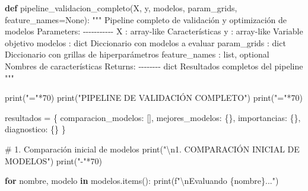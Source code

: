 \documentclass[
  doc,
  floatsintext,
  longtable,
  a4paper,
  nolmodern,
  notxfonts,
  notimes,
  12pt,
  colorlinks=true,linkcolor=blue,citecolor=blue,urlcolor=blue]{apa7}
\newenvironment{Shaded}{\begin{snugshade}}{\end{snugshade}}
\newcommand{\BuiltInTok}[1]{\textcolor[rgb]{0.00,0.23,0.31}{#1}}
\newcommand{\CharTok}[1]{\textcolor[rgb]{0.13,0.47,0.30}{#1}}
\newcommand{\CommentTok}[1]{\textcolor[rgb]{0.37,0.37,0.37}{#1}}
\newcommand{\ControlFlowTok}[1]{\textcolor[rgb]{0.00,0.23,0.31}{\textbf{#1}}}
\newcommand{\DecValTok}[1]{\textcolor[rgb]{0.68,0.00,0.00}{#1}}
\newcommand{\KeywordTok}[1]{\textcolor[rgb]{0.00,0.23,0.31}{\textbf{#1}}}
\newcommand{\NormalTok}[1]{\textcolor[rgb]{0.00,0.23,0.31}{#1}}
\newcommand{\OperatorTok}[1]{\textcolor[rgb]{0.37,0.37,0.37}{#1}}
\newcommand{\SpecialCharTok}[1]{\textcolor[rgb]{0.37,0.37,0.37}{#1}}
\newcommand{\SpecialStringTok}[1]{\textcolor[rgb]{0.13,0.47,0.30}{#1}}
\newcommand{\StringTok}[1]{\textcolor[rgb]{0.13,0.47,0.30}{#1}}
\newcommand{\VariableTok}[1]{\textcolor[rgb]{0.07,0.07,0.07}{#1}}
\begin{document}
\begin{Shaded}
\begin{Highlighting}[]
\KeywordTok{def}\NormalTok{ pipeline\_validacion\_completo(X, y, modelos, param\_grids, feature\_names}\OperatorTok{=}\VariableTok{None}\NormalTok{):}
    \CommentTok{"""}
\CommentTok{    Pipeline completo de validación y optimización de modelos}
\CommentTok{    }
\CommentTok{    Parameters:}
\CommentTok{    {-}{-}{-}{-}{-}{-}{-}{-}{-}{-}{-}}
\CommentTok{    X : array{-}like}
\CommentTok{        Características}
\CommentTok{    y : array{-}like}
\CommentTok{        Variable objetivo}
\CommentTok{    modelos : dict}
\CommentTok{        Diccionario con modelos a evaluar}
\CommentTok{    param\_grids : dict}
\CommentTok{        Diccionario con grillas de hiperparámetros}
\CommentTok{    feature\_names : list, optional}
\CommentTok{        Nombres de características}
\CommentTok{    }
\CommentTok{    Returns:}
\CommentTok{    {-}{-}{-}{-}{-}{-}{-}{-}}
\CommentTok{    dict}
\CommentTok{        Resultados completos del pipeline}
\CommentTok{    """}
    
    \BuiltInTok{print}\NormalTok{(}\StringTok{"="}\OperatorTok{*}\DecValTok{70}\NormalTok{)}
    \BuiltInTok{print}\NormalTok{(}\StringTok{"PIPELINE DE VALIDACIÓN COMPLETO"}\NormalTok{)}
    \BuiltInTok{print}\NormalTok{(}\StringTok{"="}\OperatorTok{*}\DecValTok{70}\NormalTok{)}
    
\NormalTok{    resultados }\OperatorTok{=}\NormalTok{ \{}
        \StringTok{\textquotesingle{}comparacion\_modelos\textquotesingle{}}\NormalTok{: [],}
        \StringTok{\textquotesingle{}mejores\_modelos\textquotesingle{}}\NormalTok{: \{\},}
        \StringTok{\textquotesingle{}importancias\textquotesingle{}}\NormalTok{: \{\},}
        \StringTok{\textquotesingle{}diagnostico\textquotesingle{}}\NormalTok{: \{\}}
\NormalTok{    \}}
    
    \CommentTok{\# 1. Comparación inicial de modelos}
    \BuiltInTok{print}\NormalTok{(}\StringTok{"}\CharTok{\textbackslash{}n}\StringTok{1. COMPARACIÓN INICIAL DE MODELOS"}\NormalTok{)}
    \BuiltInTok{print}\NormalTok{(}\StringTok{"{-}"}\OperatorTok{*}\DecValTok{70}\NormalTok{)}
    
    \ControlFlowTok{for}\NormalTok{ nombre, modelo }\KeywordTok{in}\NormalTok{ modelos.items():}
        \BuiltInTok{print}\NormalTok{(}\SpecialStringTok{f"}\CharTok{\textbackslash{}n}\SpecialStringTok{Evaluando }\SpecialCharTok{\{}\NormalTok{nombre}\SpecialCharTok{\}}\SpecialStringTok{..."}\NormalTok{)}
        

\end{Highlighting}
\end{Shaded}
\end{document}
